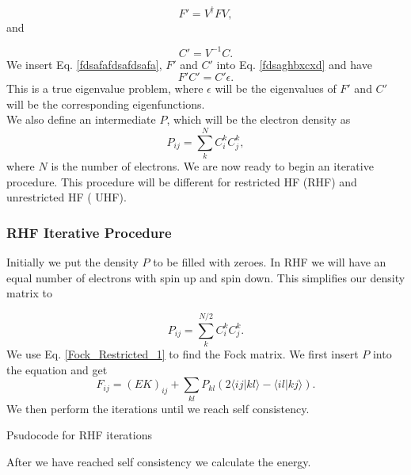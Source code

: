 \documentclass[a4paper,norsk,11pt,twoside]{report}
\begin{document}
\begin{equation}
F' = V^{\dag} F V ,
\end{equation}
and

\begin{equation}
C' = V^{-1} C .
\end{equation} 
We insert Eq. \eqref{fdsafafdsafdsafa}, $F'$ and $C'$ into Eq. \eqref{fdsaghbxcxd} and have
\begin{equation}
F' C' = C' \epsilon .
\end{equation}
This is a true eigenvalue problem, where $\epsilon$ will be the eigenvalues of $F'$ and $C'$ will be the corresponding 
eigenfunctions. \\

We also define an intermediate $P$, which will be the electron density as
\begin{equation}
P_{ij} = \sum_k^N C_i^k C_j^k ,
\end{equation}
where $N$ is the number of electrons. We are now ready to begin an iterative procedure. This procedure will be different for restricted HF (RHF) and  unrestricted HF ( UHF). 

\subsubsection{RHF Iterative Procedure}
Initially we put the density $P$ to be filled with zeroes. In RHF we
will have an equal number of electrons with spin up and spin
down. This simplifies our density matrix to

\begin{equation}
P_{ij} = \sum_k^{N/2} C_i^k C_j^k .
\end{equation}
We use Eq. \eqref{Fock_Restricted_1} to find the Fock matrix. We first insert $P$ into the equation and get
\begin{equation}
F_{ij} = (EK)_{ij} + \sum_{kl} P_{kl} (2 \langle i j | k l \rangle - \langle i l | k j \rangle) .
\end{equation}
We then perform the iterations until we reach self consistency. \\

\begin{algorithm}[H]
 \caption{Psudocode for RHF iterations}
 \label{RHF_ITERATIVE_PROCEDURE}
\end{algorithm}
After we have reached self consistency we calculate the energy.
\end{document}
